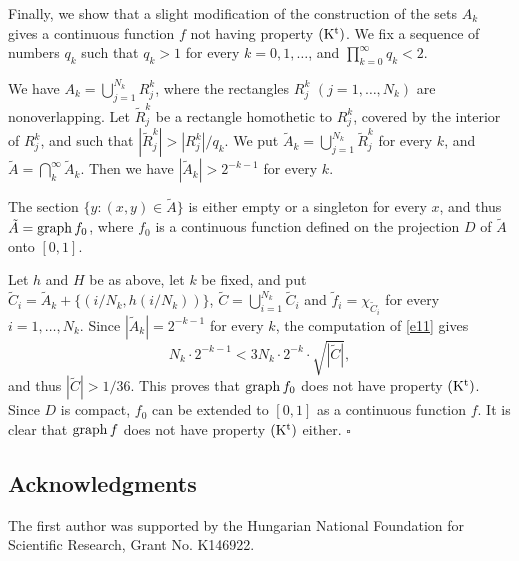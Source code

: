 \documentclass[12pt]{article}
\def\cd{\cdot}
\def\stb{,\ldots ,}
\def\nl{[0,1]}
\def\graph{{\rm graph}\, }
\begin{document}
Finally, we show that a slight modification of the construction of the sets
$A_k$ gives a continuous function $f$ not having property ${\rm (K^t)}$.
We fix a sequence of numbers $q_k$ such that $q_k >1$ for every $k=0,1,\ldots$,
and $\prod_{k=0}^\infty q_k <2$.

We have $A_k= \bigcup_{j=1}^{N_k} R_j^k$, where the rectangles $R_j^k$
$(j=1\stb N_k )$ are nonoverlapping. Let ${\tilde R}_j^k$ be a rectangle
homothetic to $R_j^k$, covered by the interior of $R_j^k$, and such that 
$|{\tilde R}_j^k |> |R_j^k | /q_k$. We put
${\tilde A}_k = \bigcup_{j=1}^{N_k} {\tilde R}_j^k$ for every $k$, and  
$\tilde A =\bigcap_k^\infty {\tilde A}_k$. Then we have $|{\tilde A}_k |
>2^{-k-1}$ for every $k$.

The section $\{ y\colon (x,y)\in \tilde A \}$ is either empty or a singleton for
every $x$, and thus $\tilde A=\graph f_0$, where $f_0$ is a continuous function
defined on the projection $D$ of $\tilde A$ onto $\nl$.

Let $h$ and $H$ be as above, let $k$ be fixed, and put ${\tilde C}_i =
{\tilde A}_k + \{ (i/N_k , h(i/N_k ))\}$, $\tilde C =\bigcup_{i=1}^{N_k}
{\tilde C}_i$ and ${\tilde f}_i = \chi _{{\tilde C}_i}$ for every $i=1\stb N_k$.
Since $|{\tilde A}_k |=2^{-k-1}$ for every $k$, the computation
of \eqref{e11} gives
$$N_k \cd 2^{-k-1}<3N_k \cd 2^{-k} \cd \sqrt{|{\tilde C}|} ,$$ 
and thus $|{\tilde C}|>1/36$. This proves that $\graph f_0$ does not have
property ${\rm (K^t)}$. Since $D$ is compact, $f_0$ can be extended to $\nl$ as
a continuous function $f$. It is clear that $\graph f$ does not have
property ${\rm (K^t)}$ either. \hfill $\square$



\subsection*{Acknowledgments}


The first author was supported by the Hungarian National Foundation for
Scientific Research, Grant No. K146922. 
\end{document}
